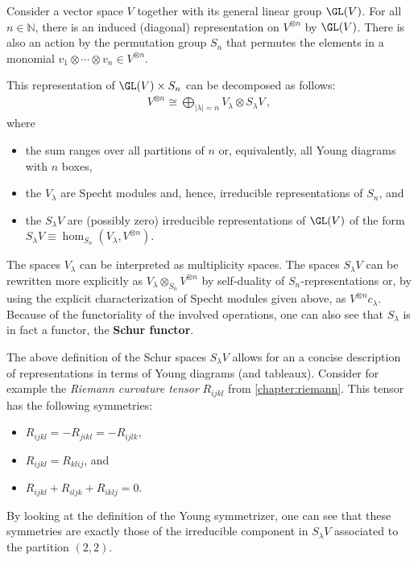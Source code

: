     Consider a vector space $V$ together with its general linear group $\GL(V)$. For all $n\in\mathbb{N}$, there is an induced (diagonal) representation on $V^{\otimes n}$ by $\GL(V)$. There is also an action by the permutation group $S_n$ that permutes the elements in a monomial $v_1\otimes\cdots\otimes v_n\in V^{\otimes n}$.
    \begin{theorem}
        This representation of $\GL(V)\times S_n$ can be decomposed as follows:
        \begin{gather}
            V^{\otimes n}\cong\bigoplus_{|\lambda|=n}V_\lambda\otimes S_\lambda V\,,
        \end{gather}
        where
        \begin{itemize}
            \item the sum ranges over all partitions of $n$ or, equivalently, all Young diagrams with $n$ boxes,
            \item the $V_\lambda$ are Specht modules and, hence, irreducible representations of $S_n$, and
            \item the $S_\lambda V$ are (possibly zero) irreducible representations of $\GL(V)$ of the form $S_\lambda V \equiv\hom_{S_n}(V_\lambda,V^{\otimes n})$.
        \end{itemize}
    \end{theorem}
    The spaces $V_\lambda$ can be interpreted as multiplicity spaces. The spaces $S_\lambda V$ can be rewritten more explicitly as $V_\lambda\otimes_{S_n} V^{\otimes n}$ by self-duality of $S_n$-representations or, by using the explicit characterization of Specht modules given above, as $V^{\otimes n}c_\lambda$. Because of the functoriality of the involved operations, one can also see that $S_\lambda$ is in fact a functor, the \textbf{Schur functor}.

    \begin{example}
        The above definition of the Schur spaces $S_\lambda V$ allows for an a concise description of representations in terms of Young diagrams (and tableaux). Consider for example the \textit{Riemann curvature tensor} $R_{ijkl}$ from \cref{chapter:riemann}. This tensor has the following symmetries:
        \begin{itemize}
            \item $R_{ijkl} = -R_{jikl} = -R_{ijlk}$,
            \item $R_{ijkl} = R_{klij}$, and
            \item $R_{ijkl} + R_{iljk} + R_{iklj} = 0$.
        \end{itemize}
        By looking at the definition of the Young symmetrizer, one can see that these symmetries are exactly those of the irreducible component in $S_\lambda V$ associated to the partition $(2,2)$.
    \end{example}

